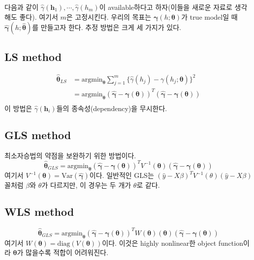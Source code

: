 \documentclass[b5paper,]{scrbook}
\theoremstyle{plain}
\theoremstyle{definition}
\numberwithin{equation}{section}
\begin{document}
다음과 같이 \(\hat{\gamma}(\mathbf{h}_{1}), \cdots , \hat{\gamma}(h_{m})\)이 available하다고 하자(이들을 새로운 자료로 생각해도 좋다). 여기서 \(m\)은 고정시킨다. 우리의 목표는 \(\boldsymbol{\gamma}(h;\boldsymbol{\theta})\)가 true model일 때 \(\hat{\boldsymbol{\gamma}}(h;\hat{\boldsymbol{\theta}})\)를 만들고자 한다. 추정 방법은 크게 세 가지가 있다.

\hypertarget{ls-method}{%
\subsection{LS method}\label{ls-method}}

\[
\begin{aligned}
\hat{\boldsymbol{\theta}}_{LS}&=\text{argmin}_{\boldsymbol{\theta}}\sum_{j=1}^{m}\{ \hat{\gamma}(h_{j})-\gamma(h_{j};\boldsymbol{\theta})\}^{2}\\
&=\text{argmin}_{\boldsymbol{\theta}}(\hat{\boldsymbol{\gamma}}-\boldsymbol{\gamma}(\boldsymbol{\theta}))^{T}(\hat{\boldsymbol{\gamma}}-\boldsymbol{\gamma}(\boldsymbol{\theta}))\\
\end{aligned}
\]
이 방법은 \(\hat{\gamma}(\mathbf{h}_{i})\)들의 종속성(dependency)을 무시한다.

\hypertarget{gls-method}{%
\subsection{GLS method}\label{gls-method}}

최소자승법의 약점을 보완하기 위한 방법이다.
\[\hat{\boldsymbol{\theta}}_{GLS}=\text{argmin}_{\boldsymbol{\theta}}(\hat{\boldsymbol{\gamma}}-\boldsymbol{\gamma}(\boldsymbol{\theta}))^{T}V^{-1}(\boldsymbol{\theta})(\hat{\boldsymbol{\gamma}}-\boldsymbol{\gamma}(\boldsymbol{\theta}))\]
여기서 \(V^{-1}(\boldsymbol{\theta})=\text{Var}(\hat{\boldsymbol{\gamma}})\)이다. 일반적인 GLS는 \((\hat{y}-X\beta)^{T}V^{-1}(\theta)(\hat{y}-X\beta)\)꼴처럼 \(\beta\)와 \(\theta\)가 다르지만, 이 경우는 두 개가 \(\theta\)로 같다.

\hypertarget{wls-method}{%
\subsection{WLS method}\label{wls-method}}

\[\hat{\boldsymbol{\theta}}_{GLS}=\text{argmin}_{\boldsymbol{\theta}}(\hat{\boldsymbol{\gamma}}-\boldsymbol{\gamma}(\boldsymbol{\theta}))^{T}W(\boldsymbol{\theta})(\boldsymbol{\theta})(\hat{\boldsymbol{\gamma}}-\boldsymbol{\gamma}(\boldsymbol{\theta}))\]
여기서 \(W(\boldsymbol{\theta})=\text{diag}(V(\boldsymbol{\theta}))\)이다. 이것은 highly nonlinear한 object function이라 \(\boldsymbol{\theta}\)가 많을수록 적합이 어려워진다.
\end{document}
